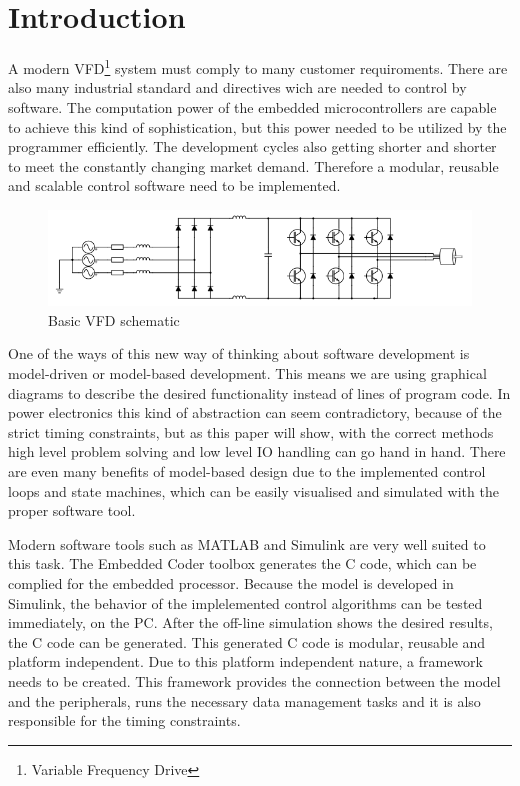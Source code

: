 \section{Introduction}
A modern VFD\footnote{Variable Frequency Drive} system must comply to many customer requiroments. There are also many industrial standard and directives wich are needed to control by software. The computation power of the embedded microcontrollers are capable to achieve this kind of sophistication, but this power needed to be utilized by the programmer efficiently. The development cycles also getting shorter and shorter to meet the constantly changing market demand. Therefore a modular, reusable and scalable control software need to be implemented.

\begin{figure}[h]
\centering
\includegraphics[width=0.8\columnwidth]{figures/VFDschematic}

\caption{Basic VFD schematic}
\label{vfd_sch}
\end{figure}

One of the ways of this new way of thinking about software development is model-driven or model-based development. This means we are using graphical diagrams to describe the desired functionality instead of lines of program code. In power electronics this kind of abstraction can seem contradictory, because  of the strict timing constraints, but as this paper will show, with the correct methods high level problem solving and low level IO handling can go hand in hand. There are even many benefits of model-based design due to the implemented control loops and state machines, which can be easily visualised and simulated with the proper software tool.

Modern software tools such as MATLAB and Simulink are very well suited to this task. The Embedded Coder toolbox generates the C code, which can be complied for the embedded processor. Because the model is developed in Simulink, the behavior of the implelemented control algorithms can be tested immediately, on the PC. After the off-line simulation shows the desired results, the C code can be generated. This generated C code is modular, reusable and platform independent. Due to this platform independent nature, a framework needs to be created. This framework provides the connection between the model and the peripherals, runs the necessary data management tasks and it is also responsible for the timing constraints.

